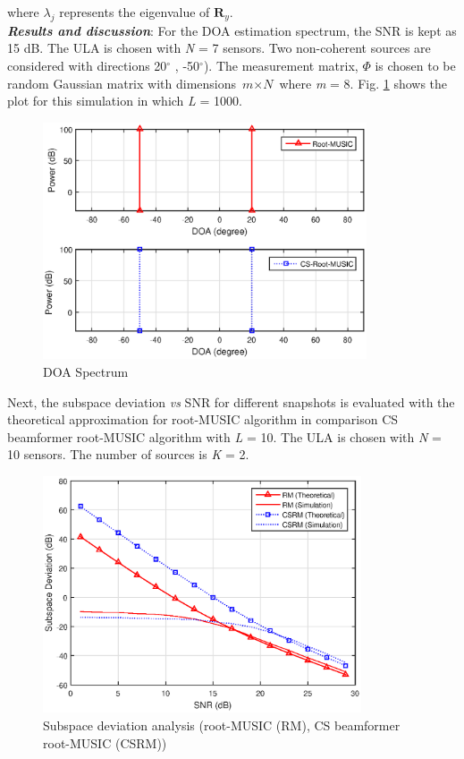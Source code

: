 \documentclass[12pt,a4paper]{article}
\theoremstyle{plain}
\theoremstyle{definition}
\begin{document}
\noindent where $\lambda_j$ represents the eigenvalue of $\textbf{R}_{y}$.\\

\textbf{\emph{Results and discussion}}: 
For the DOA estimation spectrum, the SNR is kept as 15 dB. The ULA is chosen with \textit{N} = 7 sensors. Two non-coherent sources are considered with directions 20$^\circ$ , -50$^\circ$). The measurement matrix, $\Phi$ is chosen to be random Gaussian matrix with dimensions $\textit{m}\times \textit{N}$ where \textit{m} = 8. Fig. \ref{figa4} shows the plot for this simulation in which \textit{L} = 1000. 
\begin{figure}[h]
   \centering
    \includegraphics[height=7cm]{figs/DOA_Spectrum_1.eps}   
    \caption{DOA Spectrum}
    \label{figa4}
\end{figure}
\newline Next, the subspace deviation \textit{vs} SNR for different snapshots is evaluated with the theoretical approximation for root-MUSIC algorithm in comparison CS beamformer root-MUSIC algorithm with \textit{L} = 10. The ULA is chosen with \textit{N} = 10 sensors. The number of sources is \textit{K} = 2.
 \begin{figure}[H]
   \centering
    \includegraphics[height=7cm]{figs/SD_1.eps}
    \caption{Subspace deviation analysis (root-MUSIC (RM), CS beamformer root-MUSIC (CSRM))}
    \label{figa5}
\end{figure}
\end{document}
